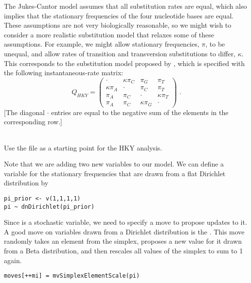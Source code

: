 The Jukes-Cantor model assumes that all substitution rates are equal, which also implies that the stationary frequencies of the four nucleotide bases are equal.
These assumptions are not very biologically reasonable, so we might wish to consider a more realistic substitution model that relaxes some of these assumptions.
For example, we might allow stationary frequencies, $\pi$, to be unequal, and allow rates of transition and transversion substitutions to differ, $\kappa$.
This corresponds to the substitution model proposed by \citet[][HKY]{Hasegawa1985}, which is specified with the following instantaneous-rate matrix: 
\begin{equation*}
Q_{HKY} = \begin{pmatrix} 
{\cdot} 			& {\kappa\pi_C} 	& {\pi_G} 			& {\pi_T} \\ 
{\kappa\pi_A} 		& {\cdot} 			& {\pi_C} 			& {\pi_T} \\ 
{\pi_A} 			& {\pi_C} 			& {\cdot} 			& {\kappa\pi_T} \\ 
{\pi_A} 			& {\pi_C} 			& {\kappa\pi_G} 	& {\cdot}  
\end{pmatrix} \mbox{  .}
\end{equation*}
[The diagonal ${\cdot}$ entries are equal to the negative sum of the elements in the corresponding row.] 

\noindent \\ \impmark Use the file  as a starting point for the HKY analysis.

Note that we are adding two new variables to our model.
We can define a variable  for the stationary frequencies that are drawn from a flat Dirichlet distribution by
{\tt \begin{snugshade*}
\begin{lstlisting}
pi_prior <- v(1,1,1,1) 
pi ~ dnDirichlet(pi_prior)
\end{lstlisting}
\end{snugshade*}}
Since  is a stochastic variable, we need to specify a move to propose updates to it.
A good move on variables drawn from a Dirichlet distribution is the .
This move randomly takes an element from the simplex, proposes a new value for it drawn from a Beta distribution, and then rescales all values of the simplex to sum to 1 again.
{\tt \begin{snugshade*}
\begin{lstlisting}
moves[++mi] = mvSimplexElementScale(pi)
\end{lstlisting}
\end{snugshade*}}


